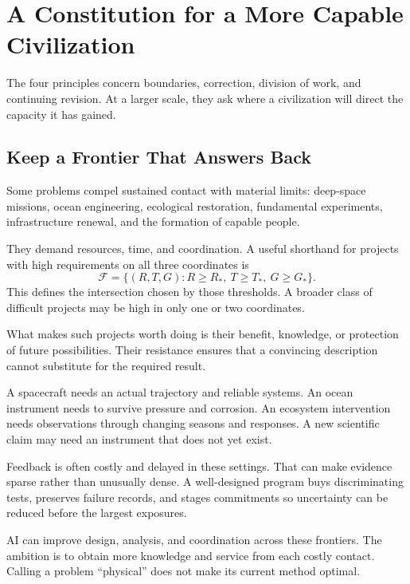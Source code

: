 \section{A Constitution for a More Capable Civilization}

The four principles concern boundaries, correction, division of work, and continuing revision. At a larger scale, they ask where a civilization will direct the capacity it has gained.

\subsection{Keep a Frontier That Answers Back}

Some problems compel sustained contact with material limits: deep-space missions, ocean engineering, ecological restoration, fundamental experiments, infrastructure renewal, and the formation of capable people.

They demand resources, time, and coordination. A useful shorthand for projects with high requirements on all three coordinates is
\begin{equation}
 \mathcal F=
 \{(R,T,G):R\geq R_\ast,\ T\geq T_\ast,\ G\geq G_\ast\}.
\end{equation}
This defines the intersection chosen by those thresholds. A broader class of difficult projects may be high in only one or two coordinates.

What makes such projects worth doing is their benefit, knowledge, or protection of future possibilities. Their resistance ensures that a convincing description cannot substitute for the required result.

A spacecraft needs an actual trajectory and reliable systems. An ocean instrument needs to survive pressure and corrosion. An ecosystem intervention needs observations through changing seasons and responses. A new scientific claim may need an instrument that does not yet exist.

Feedback is often costly and delayed in these settings. That can make evidence sparse rather than unusually dense. A well-designed program buys discriminating tests, preserves failure records, and stages commitments so uncertainty can be reduced before the largest exposures.

AI can improve design, analysis, and coordination across these frontiers. The ambition is to obtain more knowledge and service from each costly contact. Calling a problem “physical” does not make its current method optimal.

